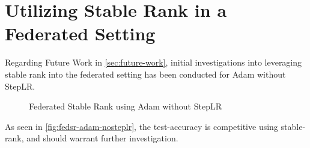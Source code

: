 \chapter{Utilizing Stable Rank in a Federated Setting}
Regarding Future Work in \autoref{sec:future-work}, initial investigations into leveraging stable rank into the federated setting has been conducted for Adam without StepLR. 

\begin{figure}[H]
    \centering
    \hspace{-0.80cm}
    \caption{Federated Stable Rank using Adam without StepLR}
    \label{fig:fedsr-adam-nosteplr}
\end{figure}

As seen in \autoref{fig:fedsr-adam-nosteplr}, the test-accuracy is competitive using stable-rank, and should warrant further investigation.